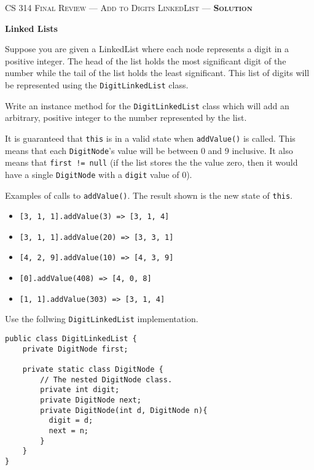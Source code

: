 \documentclass[12pt,letter]{article}
\begin{document}
\noindent\textsc{\large CS 314 Final Review --- Add to Digits LinkedList --- \textbf{Solution}}

\vspace{6pt}
\noindent\textbf{Linked Lists}

\vspace{2pt}
\noindent Suppose you are given a LinkedList where each node represents a digit in a positive integer. The head of the list holds the most significant digit
of the number while the tail of the list holds the least significant. This list of digits will be represented using the \texttt{DigitLinkedList} class.

\vspace{2pt}
\noindent Write an instance method for the \texttt{DigitLinkedList} class which will add an arbitrary, positive integer to the number represented by
the list.

\vspace{2pt}
\noindent It is guaranteed that \texttt{this} is in a valid state when \texttt{addValue()} is called. This means that each \texttt{DigitNode}'s value will
be between 0 and 9 inclusive. It also means that \texttt{first != null} (if the list stores the the value zero, then it would have a single \texttt{DigitNode} with
a \texttt{digit} value of 0).


\noindent Examples of calls to \texttt{addValue()}. The result shown is the new state of \texttt{this}.
\begin{itemize}
  \item \texttt{[3, 1, 1].addValue(3) => [3, 1, 4]}
  \item \texttt{[3, 1, 1].addValue(20) => [3, 3, 1]}
  \item \texttt{[4, 2, 9].addValue(10) => [4, 3, 9]}
  \item \texttt{[0].addValue(408) => [4, 0, 8]}
  \item \texttt{[1, 1].addValue(303) => [3, 1, 4]}
\end{itemize}

\vspace{6pt}
\noindent Use the follwing \texttt{DigitLinkedList} implementation.
\begin{verbatim}
public class DigitLinkedList {
    private DigitNode first;

    private static class DigitNode {
        // The nested DigitNode class.
        private int digit;
        private DigitNode next;
        private DigitNode(int d, DigitNode n){
          digit = d;
          next = n;
        }
    }
}
\end{verbatim}
\end{document}
